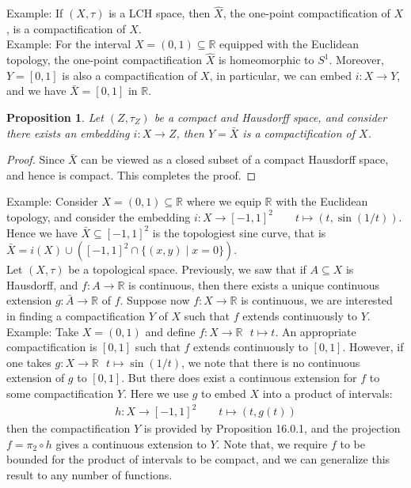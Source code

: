 \documentclass[11pt]{book}
\theoremstyle{break}
\theoremstyle{break}
\newtheorem{prop}[lem]{Proposition}
\newcommand{\R}{\mathbb{R}}
\newcommand{\example}{\color{green}Example: \color{black}}
\begin{document}
\example If $(X,\tau)$ is a LCH space, then $\hat{X}$, the one-point compactification of $X$, is a compactification of $X$.\\

\example For the interval $X=(0,1)\subseteq \R$ equipped with the Euclidean topology, the one-point compactification $\hat{X}$ is homeomorphic to $S^1$. Moreover, $Y = [0,1]$ is also a compactification of $X$, in particular, we can embed $i:X \to Y$, and we have $\bar{X} = [0,1]$ in $\R$. 

\begin{prop}
Let $(Z,\tau_Z)$ be a compact and Hausdorff space, and consider there exists an embedding $i:X\to Z$, then $Y = \bar{X}$ is a compactification of $X$.  
\end{prop}  
\begin{proof}
Since $\bar{X}$ can be viewed as a closed subset of a compact Hausdorff space, and hence is compact. This completes the proof. 
\end{proof}

\example Consider $X = (0,1) \subseteq \R$ where we equip $\R$ with the Euclidean topology, and consider the embedding $i:X\to [-1,1]^2 \qquad t\mapsto (t,\sin(1/t))$. Hence we have $\bar{X} \subseteq [-1,1]^2$ is the topologiest sine curve, that is $\bar{X} = i(X)\cup([-1,1]^2 \cap \{(x,y) \mid x = 0\})$. \\

Let $(X,\tau)$ be a topological space. Previously, we saw that if $A\subseteq X$ is Hausdorff, and $f:A \to \R$ is continuous, then there exists a unique continuous extension $g:\bar{A}\to \R$ of $f$. Suppose now $f:X \to \R$ is continuous, we are interested in finding a compactification $Y$ of $X$ such that $f$ extends continuously to $Y$. \\

\example Take $X = (0,1)$ and define $f:X \to \R \ \ \ t\mapsto t$. An appropriate compactification is $[0,1]$ such that $f$ extends continuously to $[0,1]$. However, if one takes $g:X \to \R \ \ \ t\mapsto \sin(1/t)$, we note that there is no continuous extension of $g$ to $[0,1]$. But there does exist a continuous extension for $f$ to some compactification $Y$. Here we use $g$ to embed $X$ into a product of intervals: 
\begin{align*}
h:X \to [-1,1]^2 \qquad t\mapsto (t,g(t))
\end{align*}
then the compactification $Y$ is provided by Proposition 16.0.1, and the projection $f = \pi_2 \circ h$ gives a continuous extension to $Y$. Note that, we require $f$ to be bounded for the product of intervals to be compact, and we can generalize this result to any number of functions.\\
\end{document}
